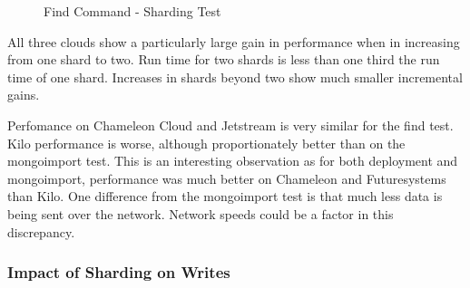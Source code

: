\documentclass[sigconf]{acmart}
\begin{document}
\begin{figure}[htbp]
\centering
{}
\caption{Find Command - Sharding Test}
\label{fig:shard-find}
\end{figure}


All three clouds show a particularly large gain in performance when in
increasing from one shard to two.  Run time for two shards is less
than one third the run time of one shard.  Increases in shards beyond
two show much smaller incremental gains.

Perfomance on Chameleon Cloud and Jetstream is very similar for the
find test.  Kilo performance is worse, although proportionately better
than on the mongoimport test.  This is an interesting observation as
for both deployment and mongoimport, performance was much better on
Chameleon and Futuresystems than Kilo.  One difference from the
mongoimport test is that much less data is being sent over the
network.  Network speeds could be a factor in this discrepancy.


\subsubsection{Impact of Sharding on Writes}
\end{document}
